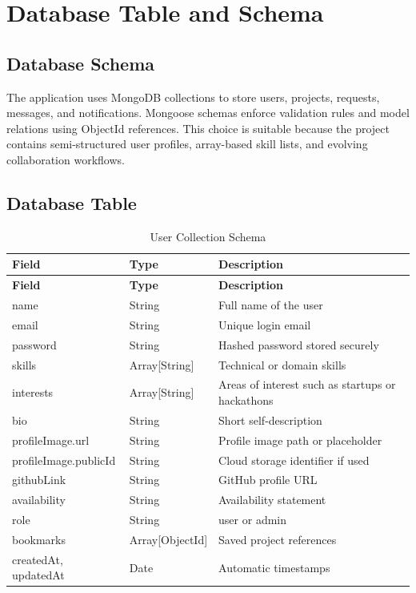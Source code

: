 \documentclass[12pt,a4paper,oneside]{report}
\begin{document}
\section{Database Table and Schema}

\subsection{Database Schema}
The application uses MongoDB collections to store users, projects, requests, messages, and notifications. Mongoose schemas enforce validation rules and model relations using ObjectId references. This choice is suitable because the project contains semi-structured user profiles, array-based skill lists, and evolving collaboration workflows.

\subsection{Database Table}
{\small
\setlength{\tabcolsep}{4pt}
\begin{longtable}{L{1.1in}L{0.95in}L{2.75in}}
\caption{User Collection Schema} \\
\toprule
\textbf{Field} & \textbf{Type} & \textbf{Description} \\
\midrule
\endfirsthead
\toprule
\textbf{Field} & \textbf{Type} & \textbf{Description} \\
\midrule
\endhead
name & String & Full name of the user \\
email & String & Unique login email \\
password & String & Hashed password stored securely \\
skills & Array[String] & Technical or domain skills \\
interests & Array[String] & Areas of interest such as startups or hackathons \\
bio & String & Short self-description \\
profileImage.url & String & Profile image path or placeholder \\
profileImage.publicId & String & Cloud storage identifier if used \\
githubLink & String & GitHub profile URL \\
availability & String & Availability statement \\
role & String & user or admin \\
bookmarks & Array[ObjectId] & Saved project references \\
createdAt, updatedAt & Date & Automatic timestamps \\
\bottomrule
\end{longtable}
}
\end{document}

